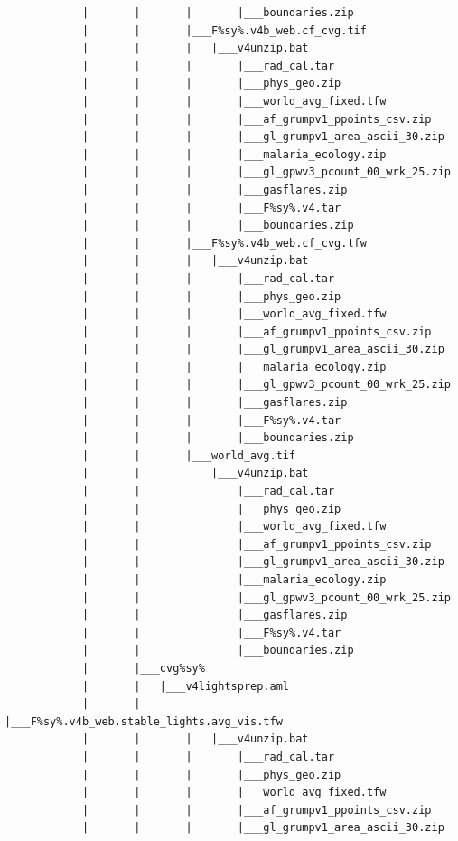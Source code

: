 \documentclass[
]{book}
\begin{document}
\begin{verbatim}
            |       |       |       |___boundaries.zip
            |       |       |___F%sy%.v4b_web.cf_cvg.tif
            |       |       |   |___v4unzip.bat
            |       |       |       |___rad_cal.tar
            |       |       |       |___phys_geo.zip
            |       |       |       |___world_avg_fixed.tfw
            |       |       |       |___af_grumpv1_ppoints_csv.zip
            |       |       |       |___gl_grumpv1_area_ascii_30.zip
            |       |       |       |___malaria_ecology.zip
            |       |       |       |___gl_gpwv3_pcount_00_wrk_25.zip
            |       |       |       |___gasflares.zip
            |       |       |       |___F%sy%.v4.tar
            |       |       |       |___boundaries.zip
            |       |       |___F%sy%.v4b_web.cf_cvg.tfw
            |       |       |   |___v4unzip.bat
            |       |       |       |___rad_cal.tar
            |       |       |       |___phys_geo.zip
            |       |       |       |___world_avg_fixed.tfw
            |       |       |       |___af_grumpv1_ppoints_csv.zip
            |       |       |       |___gl_grumpv1_area_ascii_30.zip
            |       |       |       |___malaria_ecology.zip
            |       |       |       |___gl_gpwv3_pcount_00_wrk_25.zip
            |       |       |       |___gasflares.zip
            |       |       |       |___F%sy%.v4.tar
            |       |       |       |___boundaries.zip
            |       |       |___world_avg.tif
            |       |           |___v4unzip.bat
            |       |               |___rad_cal.tar
            |       |               |___phys_geo.zip
            |       |               |___world_avg_fixed.tfw
            |       |               |___af_grumpv1_ppoints_csv.zip
            |       |               |___gl_grumpv1_area_ascii_30.zip
            |       |               |___malaria_ecology.zip
            |       |               |___gl_gpwv3_pcount_00_wrk_25.zip
            |       |               |___gasflares.zip
            |       |               |___F%sy%.v4.tar
            |       |               |___boundaries.zip
            |       |___cvg%sy%
            |       |   |___v4lightsprep.aml
            |       |       |___F%sy%.v4b_web.stable_lights.avg_vis.tfw
            |       |       |   |___v4unzip.bat
            |       |       |       |___rad_cal.tar
            |       |       |       |___phys_geo.zip
            |       |       |       |___world_avg_fixed.tfw
            |       |       |       |___af_grumpv1_ppoints_csv.zip
            |       |       |       |___gl_grumpv1_area_ascii_30.zip

\end{verbatim}
\end{document}
